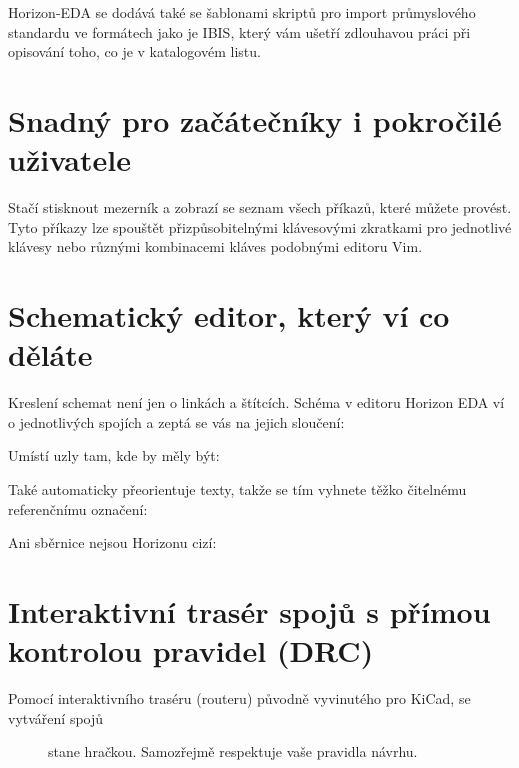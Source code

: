\documentclass[letterpaper,10pt,czech]{sphinxmanual}
\begin{document}
\noindent{}

Horizon-EDA se dodává také se šablonami skriptů pro import průmyslového standardu
ve formátech jako je IBIS, který vám ušetří zdlouhavou práci při opisování toho, co je v katalogovém listu.


\section{Snadný pro začátečníky i pokročilé uživatele}
\label{\detokenize{feature-overview:snadny-pro-zacatecniky-i-pokrocile-uzivatele}}
Stačí stisknout mezerník a zobrazí se seznam všech příkazů, které můžete provést. Tyto příkazy lze spouštět přizpůsobitelnými klávesovými zkratkami pro jednotlivé klávesy nebo různými kombinacemi kláves podobnými editoru Vim.

\noindent{}


\section{Schematický editor, který ví co děláte}
\label{\detokenize{feature-overview:schematicky-editor-ktery-vi-co-delate}}
Kreslení schemat není jen o linkách a štítcích. Schéma v editoru Horizon EDA
ví o jednotlivých spojích a zeptá se vás na jejich sloučení:

\noindent{}

Umístí uzly tam, kde by měly být:

\noindent{}

Také automaticky přeorientuje texty, takže se tím vyhnete
těžko čitelnému referenčnímu označení:

\noindent{}

Ani sběrnice nejsou Horizonu cizí:

\noindent{}


\section{Interaktivní trasér spojů s přímou kontrolou pravidel (DRC)}
\label{\detokenize{feature-overview:interaktivni-traser-spoju-s-primou-kontrolou-pravidel-drc}}\begin{description}
\item[{Pomocí interaktivního traséru (routeru) původně vyvinutého pro KiCad, se vytváření spojů}] \leavevmode
stane hračkou. Samozřejmě respektuje vaše pravidla návrhu.

\end{description}
\end{document}
